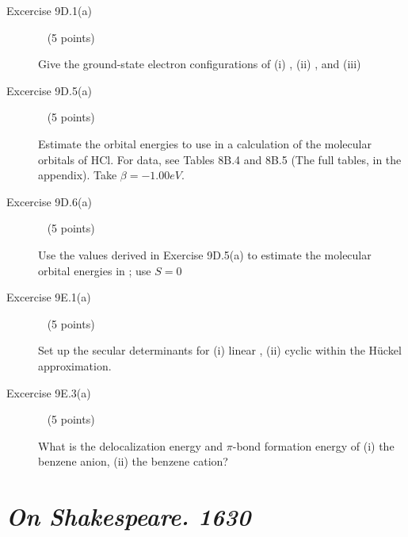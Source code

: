 \documentclass[10pt, letterpaper]{memoir}
\begin{document}
\begin{description}
	\vspace{22em}
	\item [Excercise 9D.1(a)] ~ (5 points)
	
	Give the ground-state electron configurations of (i) , (ii) , and (iii) 
	
	\vspace{25em}
	\item [Excercise 9D.5(a)] ~ (5 points)
	
	Estimate the orbital energies to use in a calculation of the molecular orbitals of HCl. For data, see Tables 8B.4 and 8B.5 (The full tables, in the appendix). Take $\beta=-1.00eV$.
	
	\vspace{13em}
	\item [Excercise 9D.6(a)] ~ (5 points)
	
	Use the values derived in Exercise 9D.5(a) to estimate the molecular orbital energies in ; use $S=0$
	
	
	\vspace{15em}
	\item [Excercise 9E.1(a)] ~ (5 points)
	
	Set up the secular determinants for (i) linear , (ii) cyclic  within the H\"uckel approximation.
	
	\vspace{15em}
	\item [Excercise 9E.3(a)] ~ (5 points)
	
	What is the delocalization energy and $\pi$-bond formation energy of (i) the benzene anion, (ii) the benzene cation?
\end{description}

\newpage
\pagestyle{empty}
\addtocounter{page}{-1}
\section*{\emph{On Shakespeare. 1630}}
\end{document}
